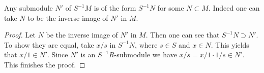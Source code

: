 \begin{lemma}
\label{lemma-submodule-localization}
Any submodule $N'$ of $S^{-1}M$ is of the form $S^{-1}N$ for some
$N\subset M$. Indeed one can take $N$ to be the inverse image of
$N'$ in $M$.
\end{lemma}

\begin{proof}
Let $N$ be the inverse image of $N'$ in $M$. Then one can see that
$S^{-1}N\supset N'$. To show they are equal, take $x/s$ in
$S^{-1}N$, where $s\in S$ and $x\in N$. This yields that $x/1\in
N'$. Since $N'$ is an $S^{-1}R$-submodule we have
$x/s = x/1\cdot 1/s\in N'$. This finishes the proof.
\end{proof}
